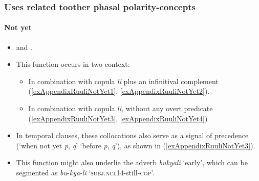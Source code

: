 \subsubsection{Uses related toother phasal polarity-concepts}
\paragraph{Not yet}
\label{appendixRuuliNotYet}
\begin{itemize}
 	\item \textcite{MolochievaEtAl2021} and \textcite[63–66]{NamyaloEtAl2021}.
	\item This function occurs in two context:
	\begin{itemize}
	\item In combination with copula \textit{li} plus an infinitival complement (\ref{exAppendixRuuliNotYet1}, \ref{exAppendixRuuliNotYet2}). 
	\item In combination with copula \textit{li}, without any overt predicate (\ref{exAppendixRuuliNotYet3}, \ref{exAppendixRuuliNotYet4}) 
	\end{itemize}	
	\item In temporal clauses, these collocations also serve as a signal of precedence (\lq when not yet \textit{p}, \textit{q}' \equiv \lq before \textit{p}, \textit{q}'), as shown in (\ref{exAppendixRuuliNotYet3}).	
	\item This function might also underlie the adverb \textit{bukyali} \lq early', which can be segmented as \textit{bu}-\textit{kya}-\textit{li} \lq \textsc{subj}.\textsc{ncl14}-still-\textsc{cop}'.
\end{itemize}\largerpage

